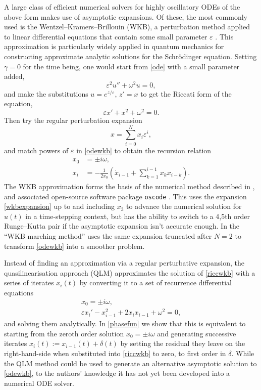 \documentclass[10pt]{article}
\newcommand{\be}{\begin{equation}}
\newcommand{\ee}{\end{equation}}
\newcommand{\om}{\omega}
\newcommand{\g}{\gamma}
\begin{document}
A large class of efficient numerical solvers for highly oscillatory ODEs of the
above form makes use of asymptotic expansions. 
Of these, the most commonly used is the Wentzel--Kramers--Brillouin (WKB), a
perturbation method applied to linear differential equations that contain some
small parameter $\varepsilon$ \cite{logan,benderorszag}. This approximation is particularly widely applied in quantum mechanics for constructing approximate analytic solutions for the Schr\"{o}dinger equation. 
Setting $\g = 0$ for
the time being, one would start from \cref{ode} with a small parameter added,
\be\label{odewkb}
\varepsilon^2 u'' + \om^2 u = 0,
\ee
and make the substitutions $u = e^{z/\varepsilon}$, $z' = x$ to get the Riccati form of the equation,
\be\label{riccwkb}
\varepsilon x' + x^2 + \om^2 = 0.
\ee
Then try the regular perturbation expansion
\be\label{wkbexpansion}
x = \sum_{i=0}^{N} x_i\varepsilon^i,
\ee
and match powers of $\varepsilon$ in \cref{odewkb} to obtain the recursion relation
\begin{align}\label{wkbrecur}
    x_0 &= \pm i\om,\\
    x_i &= -\frac{1}{2x_0}\left( \dot{x}_{i-1} + \sum_{k = 1}^{i-1}x_k x_{i-k} \right).
\end{align}
The WKB approximation forms the basis of the numerical method described in
\cite{agocs2020efficient,agocs2020dense}, and associated open-source software
package \texttt{oscode} \cite{agocs2020joss}. This uses the expansion
\cref{wkbexpansion} up to and including $x_3$ to advance the numerical solution
for $u(t)$ in a time-stepping context, but has the ability to switch to a 4,5th
order Runge--Kutta pair if the asymptotic expansion isn't accurate enough. 
In \cite{arnold2011wkb,korner2022wkb} the ``WKB marching method'' uses the same
expansion truncated after $N = 2$  to transform \cref{odewkb} into a smoother
problem.

Instead of finding an approximation via a regular perturbative expansion, the
quasilinearisation approach (QLM) \cite{bellman1970} approximates the solution
of \cref{riccwkb} with a series of iterates $x_i(t)$ by converting it to a set
of recurrence differential equations
\begin{gather}\label{qlmode}
x_0 = \pm i\om, \\
\varepsilon x_i' - x_{i-1}^2 + 2x_i x_{i-1} + \om^2 = 0,
\end{gather}
and solving them analytically. In \cref{phasefun} we show that this is equivalent to
starting from the zeroth order solution $x_0 = \pm i\om$ and generating
successive iterates $x_i(t) := x_{i-1}(t) + \delta(t)$ by setting the residual they leave on the
right-hand-side when substituted into \cref{riccwkb} to zero, to first order in
$\delta$. While the QLM method could be used to generate an alternative
asymptotic solution to \cref{odewkb}, to the authors' knowledge it has not yet
been developed into a numerical ODE solver.
\end{document}
